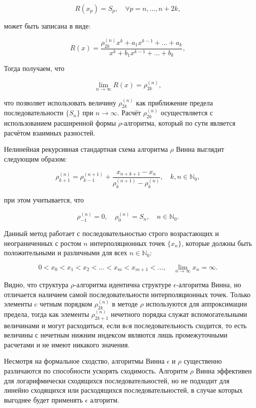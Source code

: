 \documentclass[14pt, a4paper]{extarticle}
\theoremstyle{definition}
\theoremstyle{remark}
\begin{document}
\[
R(x_{p}) = S_{p}, \quad \forall p = n,\ldots,n+2k, 
\]

может быть записана в виде:

\[
R(x) = \frac{\rho_{2k}^{(n)} x^{k} + a_{1} x^{k-1} + \ldots + a_{k}}{x^{k} + b_{1} x^{k-1} + \ldots + b_{k}},
\]

Тогда получаем, что 

\[
\lim_{n \to \infty} R(x) = \rho_{2k}^{(n)},
\]

что позволяет использовать величину \(\rho_{2k}^{(n)}\) как приближение предела последовательности \(\{ S_{n} \}\) при \(n \to \infty\). Расчёт \(\rho_{2k}^{(n)}\) осуществляется с использованием расширенной формы \emph{$\rho$}-алгоритма, который по сути является расчётом взаимных разностей.


Нелинейная рекурсивная стандартная схема алгоритма \emph{$\rho$} Винна выглядит следующим образом:

\[
\rho_{k+1}^{(n)} = \rho_{k-1}^{(n+1)} + \frac{x_{n+k+1} - x_n}{\rho_{k}^{(n+1)} - \rho_{k}^{(n)}}, \quad k,n \in \mathbb{N}_{0},
\]

при этом учитывается, что 

\[
\rho_{-1}^{(n)} = 0, \quad \rho_0^{(n)} = S_n, \quad n \in \mathbb{N}_{0}.
\]

Данный метод работает с последовательностью строго возрастающих и неограниченных с ростом \(n\) интерполяционных точек \(\{x_n\}\), которые должны быть положительными и различными для всех \(n \in \mathbb{N}_{0}\):

\[
0 < x_0 < x_1 < x_2 < \ldots < x_m < x_{m+1} < \ldots, \quad \lim_{n \to \infty} x_n = \infty.
\]

Видно, что структура $\rho$-алгоритма идентична структуре $\epsilon$-алгоритма
Винна, но отличается наличием самой последовательности интерполяционных
точек. Только элементы c четным порядком \(\rho_{2k}^{(n)}\) в методе
\emph{$\rho$} используются для аппроксимации предела, тогда как элементы
\(\rho_{2k + 1}^{(n)}\) нечетного порядка служат вспомогательными
величинами и могут расходиться, если вcя последовательность сходится, то
есть величины с нечетным нижним индексом являются лишь промежуточными
расчетами и не имеют никакого значения.

Несмотря на формальное сходство, алгоритмы Винна \(\epsilon\) и \emph{$\rho$}
существенно различаются по способности ускорять сходимость. Алгоритм
\emph{$\rho$} Винна эффективен для логарифмически сходящихся
последовательностей, но не подходит для линейно сходящихся или
расходящихся последовательностей, в случае которых выгоднее будет
применять \(\epsilon\) алгоритм.
\end{document}
